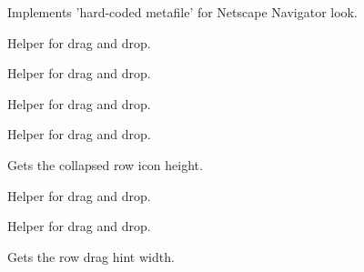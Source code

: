 Implements 'hard-coded metafile' for Netscape Navigator look.


\label{cbrowdragpluginexpandrow}


Helper for drag and drop.


\label{cbrowdragpluginfinishonscreendraw}


Helper for drag and drop.


\label{cbrowdragplugingetcollapsediconspos}


Helper for drag and drop.


\label{cbrowdragplugingetcollapsedinconrect}


Helper for drag and drop.


\label{cbrowdragplugingetcollapsedrowiconheight}


Gets the collapsed row icon height.


\label{cbrowdragplugingetfirstrow}


Helper for drag and drop.


\label{cbrowdragplugingethrowscountforpane}


Helper for drag and drop.


\label{cbrowdragplugingetrowdraghintwidth}


Gets the row drag hint width.


\label{cbrowdragplugingetrowhintrect}


